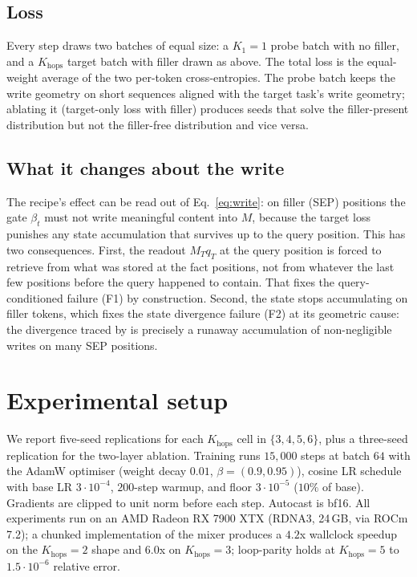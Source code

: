 \documentclass[11pt]{article}
\begin{document}
\subsection{Loss}

Every step draws two batches of equal size: a $K_1 = 1$ probe batch
with no filler, and a $K_{\mathrm{hops}}$ target batch with filler
drawn as above. The total loss is the equal-weight average of the
two per-token cross-entropies. The probe batch keeps the write
geometry on short sequences aligned with the target task's write
geometry; ablating it (target-only loss with filler) produces seeds
that solve the filler-present distribution but not the filler-free
distribution and vice versa.

\subsection{What it changes about the write}

The recipe's effect can be read out of Eq.~\ref{eq:write}: on filler
(SEP) positions the gate $\beta_t$ must not write meaningful content
into $M$, because the target loss punishes any state accumulation
that survives up to the query position. This has two consequences.
First, the readout $M_T q_T$ at the query position is forced to
retrieve from what was stored at the fact positions, not from
whatever the last few positions before the query happened to
contain. That fixes the query-conditioned failure (F1) by
construction.
Second, the state stops accumulating on filler tokens, which fixes
the state divergence failure (F2) at its geometric cause: the
divergence traced by \citet{fenrir2026} is precisely a runaway
accumulation of non-negligible writes on many SEP positions.

\section{Experimental setup}
\label{sec:setup}

We report five-seed replications for each $K_{\mathrm{hops}}$ cell in
$\{3, 4, 5, 6\}$, plus a three-seed replication for the two-layer
ablation. Training runs $15{,}000$ steps at batch $64$ with the
AdamW optimiser (weight decay $0.01$, $\beta = (0.9, 0.95)$),
cosine LR schedule with base LR $3 \cdot 10^{-4}$, $200$-step
warmup, and floor $3 \cdot 10^{-5}$ ($10\%$ of base). Gradients
are clipped to unit norm before each step. Autocast is bf16. All
experiments run on an AMD Radeon RX 7900 XTX (RDNA3, 24\,GB, via
ROCm 7.2); a chunked implementation of the mixer
\citep{yang2024deltanet,fenrir2026} produces a $4.2$x wallclock
speedup on the $K_{\mathrm{hops}}=2$ shape and $6.0$x on
$K_{\mathrm{hops}}=3$; loop-parity holds at $K_{\mathrm{hops}}=5$
to $1.5 \cdot 10^{-6}$ relative error.
\end{document}

